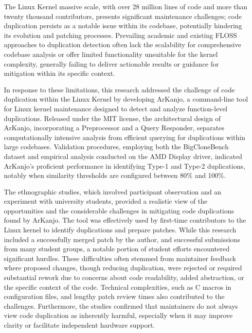 The Linux Kernel massive scale, with over 28 million lines of code 
and more than twenty thousand contributors, presents significant maintenance 
challenges; code duplication persists as a notable issue within its codebase, 
potentially hindering its evolution and patching processes. Prevailing academic 
and existing FLOSS approaches to duplication detection often lack the 
scalability for comprehensive codebase analysis or offer limited functionality 
unsuitable for the kernel complexity, generally failing to deliver actionable 
results or guidance for mitigation within its specific context.

In response to these limitations, this research addressed the challenge of code 
duplication within the Linux Kernel by developing ArKanjo, a command-line tool 
for Linux kernel maintenance designed to detect and analyze function-level duplications. 
Released under the MIT license, the architectural design of ArKanjo, incorporating a 
Preprocessor and a Query Responder, separates computationally intensive analysis from 
efficient querying for duplications within large codebases. Validation procedures, 
employing both the BigCloneBench dataset and empirical analysis conducted on the AMD 
Display driver, indicated ArKanjo's proficient performance in identifying Type-1 and 
Type-2 duplications, notably when similarity thresholds are configured between 80\% and 100\%.

The ethnographic studies, which involved participant observation and an experiment with university 
students, provided a realistic view of the opportunities and the considerable challenges in 
mitigating code duplications found by ArKanjo. The tool was effectively used by first-time 
contributors to the Linux kernel to 
identify duplications and prepare patches. While this research included a successfully merged 
patch by the author, and successful submissions from many student groups, a notable portion of 
student efforts encountered significant hurdles. These difficulties often stemmed from maintainer 
feedback where proposed changes, though reducing duplication, were rejected or required 
substantial rework due to concerns about code readability, added abstraction, or the specific 
context of the code. Technical complexities, such as C macros in configuration files, and lengthy 
patch review times also contributed to the challenges. Furthermore, the studies confirmed that 
maintainers do not always view code duplication as inherently harmful, especially when it may 
improve clarity or facilitate independent hardware support.

